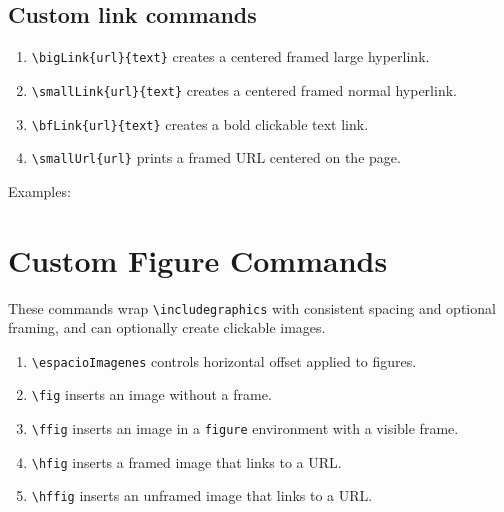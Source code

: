 \begin{minipage}{\anchoPag}
		\subsection{Custom link commands}
		
		\begin{enumerate}
			\item \texttt{\textbackslash bigLink\{url\}\{text\}} creates a centered framed large hyperlink.
			\item \texttt{\textbackslash smallLink\{url\}\{text\}} creates a centered framed normal hyperlink.
			\item \texttt{\textbackslash bfLink\{url\}\{text\}} creates a bold clickable text link.
			\item \texttt{\textbackslash smallUrl\{url\}} prints a framed URL centered on the page.
		\end{enumerate}
		
		\begin{mdframed}[style=estiloGeneral]
			Examples:
			
			
			
			
		\end{mdframed}
		
		\section{Custom Figure Commands}\label{sec:figcmd}
		
		These commands wrap \texttt{\textbackslash includegraphics} with consistent spacing and optional framing, and can optionally create clickable images.
		
		\begin{enumerate}
			\item \texttt{\textbackslash espacioImagenes} controls horizontal offset applied to figures.
			\item \texttt{\textbackslash fig} inserts an image without a frame.
			\item \texttt{\textbackslash ffig} inserts an image in a \texttt{figure} environment with a visible frame.
			\item \texttt{\textbackslash hfig} inserts a framed image that links to a URL.
			\item \texttt{\textbackslash hffig} inserts an unframed image that links to a URL.
		\end{enumerate}
		

\end{minipage}
